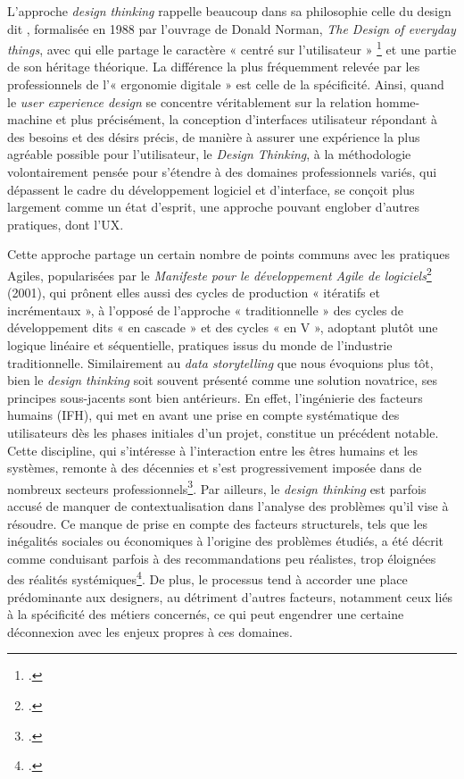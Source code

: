 L’approche \textit{design thinking} rappelle beaucoup dans sa philosophie celle du design dit \ux, formalisée en 1988 par l’ouvrage de Donald Norman, \textit{The Design of everyday things}, avec qui elle partage le caractère « centré sur l’utilisateur » \footcite[p.175]{pelissier_accompagner_2017} et une partie de son héritage théorique. La différence la plus fréquemment relevée par les professionnels de l’« ergonomie digitale » est celle de la spécificité. Ainsi, quand le \textit{user experience design} se concentre véritablement sur la relation homme-machine et plus précisément, la conception d’interfaces utilisateur répondant à des besoins et des désirs précis, de manière à assurer une expérience la plus agréable possible pour l’utilisateur, le \textit{Design Thinking}, à la méthodologie volontairement pensée pour s’étendre à des domaines professionnels variés, qui dépassent le cadre du développement logiciel et d’interface, se conçoit plus largement comme un état d’esprit, une approche pouvant englober d’autres pratiques, dont l’UX. 

Cette approche partage un certain nombre de points communs avec les pratiques Agiles, popularisées par le \textit{Manifeste pour le développement Agile de logiciels}\footcite{noauthor_manifeste_nodate} (2001), qui prônent elles aussi des cycles de production « itératifs et incrémentaux », à l’opposé de l’approche « traditionnelle » des cycles de développement dits « en cascade » et des cycles « en V », adoptant plutôt une logique linéaire et séquentielle, pratiques issus du monde de l’industrie traditionnelle. 
Similairement au \textit{data storytelling} que nous évoquions plus tôt, bien le \textit{design thinking} soit souvent présenté comme une solution novatrice, ses principes sous-jacents sont bien antérieurs. En effet, l’ingénierie des facteurs humains (IFH), qui met en avant une prise en compte systématique des utilisateurs dès les phases initiales d'un projet, constitue un précédent notable. Cette discipline, qui s'intéresse à l'interaction entre les êtres humains et les systèmes, remonte à des décennies et s'est progressivement imposée dans de nombreux secteurs professionnels\footcite{vautier_ingenierie_1999}. 
Par ailleurs, le \textit{design thinking} est parfois accusé de manquer de contextualisation dans l’analyse des problèmes qu’il vise à résoudre. Ce manque de prise en compte des facteurs structurels, tels que les inégalités sociales ou économiques à l’origine des problèmes étudiés, a été décrit comme conduisant parfois à des recommandations peu réalistes, trop éloignées des réalités systémiques\footcite{ackermann_design_2023}. De plus, le processus tend à accorder une place prédominante aux designers, au détriment d’autres facteurs, notamment ceux liés à la spécificité des métiers concernés, ce qui peut engendrer une certaine déconnexion avec les enjeux propres à ces domaines.

